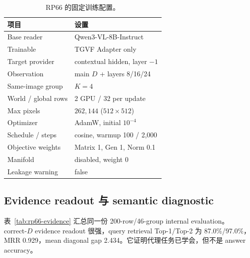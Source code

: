 \documentclass[UTF8,twocolumn,10pt,a4paper]{ctexart}
\begin{document}
\begin{table}[t]
\centering
\caption{RP66 的固定训练配置。}
\label{tab:rp66-config}
\small
\begin{tabular}{ll}
\toprule
项目 & 设置 \\
\midrule
Base reader & Qwen3-VL-8B-Instruct \\
Trainable & TGVF Adapter only \\
Target provider & contextual hidden, layer $-1$ \\
Observation & main $D$ + layers 8/16/24 \\
Same-image group & $K=4$ \\
World / global rows & 2 GPU / 32 per update \\
Max pixels & $262{,}144$ ($512\times512$) \\
Optimizer & AdamW, initial $10^{-4}$ \\
Schedule / steps & cosine, warmup 100 / 2,000 \\
Objective weights & Matrix 1, Gen 1, Norm 0.1 \\
Manifold & disabled, weight 0 \\
Leakage warning & false \\
\bottomrule
\end{tabular}
\end{table}

\subsection{Evidence readout 与 semantic diagnostic}

表~\ref{tab:rp66-evidence} 汇总同一份 200-row/46-group internal evaluation。correct-$D$ evidence readout 很强，query retrieval Top-1/Top-2 为 87.0\%/97.0\%，MRR 0.929，mean diagonal gap 2.434。它证明代理任务已学会，但不是 answer accuracy。
\end{document}
